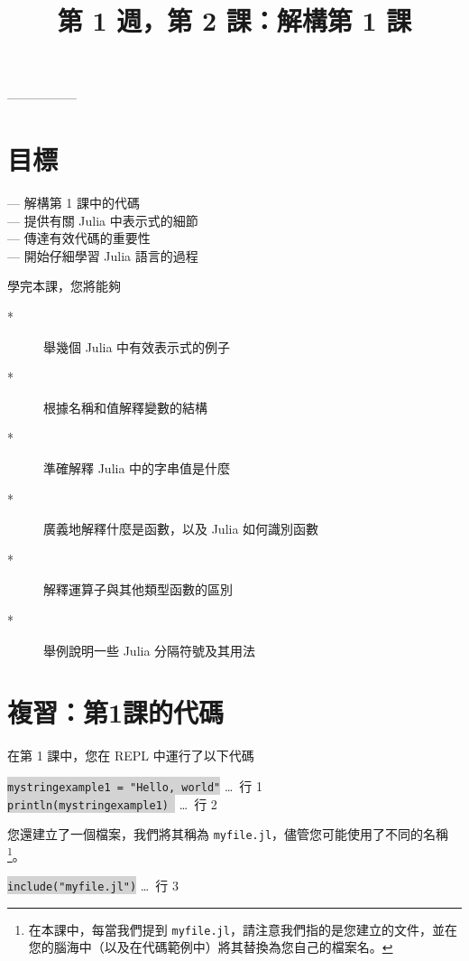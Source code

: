 \documentclass[]{article}
\begin{document}
\author{}  \date{}
\title{第 1 週，第 2 課：解構第 1 課}
\maketitle

\vspace*{-2cm}
-----------------

\section*{目標}

--- 解構第 1 課中的代碼 \\
--- 提供有關 Julia 中表示式的細節 \\
--- 傳達有效代碼的重要性 \\
--- 開始仔細學習 Julia 語言的過程

學完本課，您將能夠 \vspace{-3ex} \begin{description}
	\item[*] 舉幾個 Julia 中有效表示式的例子
	\item[*] 根據名稱和值解釋變數的結構
	\item[*] 準確解釋 Julia 中的字串值是什麼
	\item[*] 廣義地解釋什麼是函數，以及 Julia 如何識別函數
  \item[*] 解釋運算子與其他類型函數的區別
	\item[*] 舉例說明一些 Julia 分隔符號及其用法
\end{description}

\section*{複習：第1課的代碼}

在第 1 課中，您在 REPL 中運行了以下代碼

\colorbox{lightgray}{\tt mystringexample1 = "Hello, world"}  \hspace{3cm} \ldots\ 行 1\\
\colorbox{lightgray}{\tt println(mystringexample1) } \hspace{4.3cm} \ldots\ 行 2

您還建立了一個檔案，我們將其稱為 {\tt myfile.jl}，儘管您可能使用了不同的名稱\footnote{在本課中，每當我們提到 {\tt myfile.jl}，請注意我們指的是您建立的文件，並在您的腦海中（以及在代碼範例中）將其替換為您自己的檔案名。}。

\colorbox{lightgray}{\tt include("myfile.jl")} \hspace{5.5cm} \ldots\ 行 3
\end{document}
